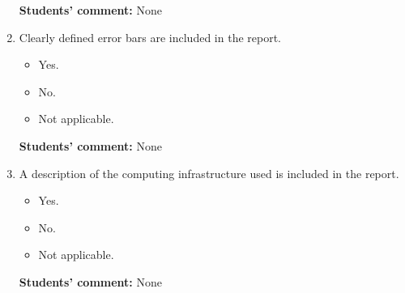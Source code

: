\documentclass{article}
\begin{document}
\begin{enumerate}
    \textbf{Students' comment:} None
    
    \item Clearly defined error bars are included in the report.
    \begin{itemize}
        \item [\faSquareO] Yes.
        \item [\faSquareO] No.
        \item [\faSquareO] Not applicable.
    \end{itemize}
    
    \textbf{Students' comment:} None
    
    \item A description of the computing infrastructure used is included in the report.
    \begin{itemize}
        \item [\faCheckSquareO] Yes.
        \item [\faSquareO] No.
        \item [\faSquareO] Not applicable.
    \end{itemize}
    
    \textbf{Students' comment:} None
\end{enumerate}
\end{document}
